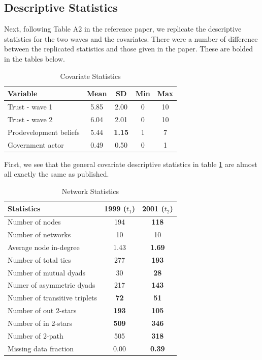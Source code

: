 \documentclass[12pt]{article} %
\numberwithin{equation}{section}		%
\numberwithin{figure}{section}			%
\numberwithin{table}{section}				%
\begin{document}
\subsection{Descriptive Statistics}
Next, following Table A2 in the reference paper, we replicate the descriptive statistics for the two waves and the covariates. There were a number of difference between the replicated statistics and those given in the paper. These are bolded in the tables below.

\begin{table}[ht]
 	   \caption{\label{tab01} Covariate Statistics}
 	\centering
 	\begin{tabular}{lcccc}
 		\hline
 		Variable & Mean & SD & Min & Max \\ 	
 		\hline
 		Trust - wave 1 & 5.85 & 2.00 & 0 & 10 \\
 		Trust - wave 2 & 6.04 & 2.01 & 0 & 10 \\
 		Prodevelopment beliefs & 5.44 & \textbf{1.15} & 1 & 7 \\
 		Government actor & 0.49 & 0.50 & 0 & 1 \\
 		\hline
 	\end{tabular}
\end{table}

First, we see that the general covariate descriptive statistics in table \ref{tab01} are almost all exactly the same as published.

\begin{table}[ht]
 	   \caption{\label{tab02} Network Statistics}
 	\centering
 	\begin{tabular}{lcc}
 		\hline
 		Statistics & 1999 ($t_1$) & 2001 ($t_2$) \\ 	
 		\hline
 		Number of nodes & 194 & \textbf{118} \\
 		Number of networks & 10 & 10 \\
 		Average node in-degree & 1.43 & \textbf{1.69} \\
 		Number of total ties & 277 & \textbf{193} \\
 		Number of mutual dyads & 30 & \textbf{28} \\
 		Numer of asymmetric dyads & 217 & \textbf{143} \\
 		Number of transitive triplets & \textbf{72} & \textbf{51} \\
 		Number of out 2-stars & \textbf{193} & \textbf{105} \\
 		Number of in 2-stars & \textbf{509} & \textbf{346} \\
 		Number of 2-path & 505 & \textbf{318} \\
 		Missing data fraction & 0.00 & \textbf{0.39} \\
 		\hline
 	\end{tabular}
\end{table}
\end{document}
